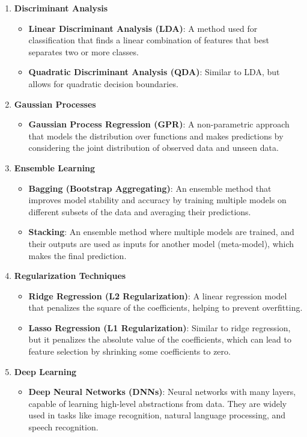 \documentclass{article}
\begin{document}
\begin{enumerate}
    \item \textbf{Discriminant Analysis}
    \begin{itemize}
        \item \textbf{Linear Discriminant Analysis (LDA)}: A method used for classification that finds a linear combination of features that best separates two or more classes.
        \item \textbf{Quadratic Discriminant Analysis (QDA)}: Similar to LDA, but allows for quadratic decision boundaries.
    \end{itemize}

    \item \textbf{Gaussian Processes}
    \begin{itemize}
        \item \textbf{Gaussian Process Regression (GPR)}: A non-parametric approach that models the distribution over functions and makes predictions by considering the joint distribution of observed data and unseen data.
    \end{itemize}

    \item \textbf{Ensemble Learning}
    \begin{itemize}
        \item \textbf{Bagging (Bootstrap Aggregating)}: An ensemble method that improves model stability and accuracy by training multiple models on different subsets of the data and averaging their predictions.
        \item \textbf{Stacking}: An ensemble method where multiple models are trained, and their outputs are used as inputs for another model (meta-model), which makes the final prediction.
    \end{itemize}

    \item \textbf{Regularization Techniques}
    \begin{itemize}
        \item \textbf{Ridge Regression (L2 Regularization)}: A linear regression model that penalizes the square of the coefficients, helping to prevent overfitting.
        \item \textbf{Lasso Regression (L1 Regularization)}: Similar to ridge regression, but it penalizes the absolute value of the coefficients, which can lead to feature selection by shrinking some coefficients to zero.
    \end{itemize}

    \item \textbf{Deep Learning}
    \begin{itemize}
        \item \textbf{Deep Neural Networks (DNNs)}: Neural networks with many layers, capable of learning high-level abstractions from data. They are widely used in tasks like image recognition, natural language processing, and speech recognition.
    \end{itemize}
\end{enumerate}
\end{document}
